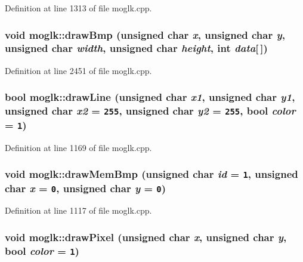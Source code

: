 Definition at line 1313 of file moglk.cpp.\hypertarget{classmoglk_38ad099b570c6f81d9a5ae6251ae77d1}{
\subsubsection[{drawBmp}]{\setlength{\rightskip}{0pt plus 5cm}void moglk::drawBmp (unsigned char {\em x}, \/  unsigned char {\em y}, \/  unsigned char {\em width}, \/  unsigned char {\em height}, \/  int {\em data}\mbox{[}$\,$\mbox{]})}}
\label{classmoglk_38ad099b570c6f81d9a5ae6251ae77d1}




Definition at line 2451 of file moglk.cpp.\hypertarget{classmoglk_d77d8ff35162a554708c3e93c37e0c7a}{
\subsubsection[{drawLine}]{\setlength{\rightskip}{0pt plus 5cm}bool moglk::drawLine (unsigned char {\em x1}, \/  unsigned char {\em y1}, \/  unsigned char {\em x2} = {\tt 255}, \/  unsigned char {\em y2} = {\tt 255}, \/  bool {\em color} = {\tt 1})}}
\label{classmoglk_d77d8ff35162a554708c3e93c37e0c7a}




Definition at line 1169 of file moglk.cpp.\hypertarget{classmoglk_db45e510307e1c98467d4ee31cc845a6}{
\subsubsection[{drawMemBmp}]{\setlength{\rightskip}{0pt plus 5cm}void moglk::drawMemBmp (unsigned char {\em id} = {\tt 1}, \/  unsigned char {\em x} = {\tt 0}, \/  unsigned char {\em y} = {\tt 0})}}
\label{classmoglk_db45e510307e1c98467d4ee31cc845a6}




Definition at line 1117 of file moglk.cpp.\hypertarget{classmoglk_903c108a85fd088ce9d0f2520773a781}{
\subsubsection[{drawPixel}]{\setlength{\rightskip}{0pt plus 5cm}void moglk::drawPixel (unsigned char {\em x}, \/  unsigned char {\em y}, \/  bool {\em color} = {\tt 1})}}
\label{classmoglk_903c108a85fd088ce9d0f2520773a781}





